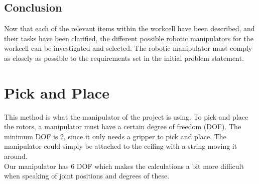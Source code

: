  \subsection{Conclusion}
 Now that each of the relevant items within the workcell have been described, and their tasks have been clarified, the different possible robotic manipulators for the workcell can be investigated and selected. The robotic manipulator must comply as closely as possible to the requirements set in the initial problem statement. 
 
 \section{Pick and Place}

This method is what the manipulator of the project is using. To pick and place the rotors, a manipulator must have a certain degree of freedom (DOF). The minimum DOF is 2, since it only needs a gripper to pick and place. The manipulator could simply be attached to the ceiling with a string moving it around.\\
Our manipulator has 6 DOF which makes the calculations a bit more difficult when speaking of joint positions and degrees of these.\\
 


